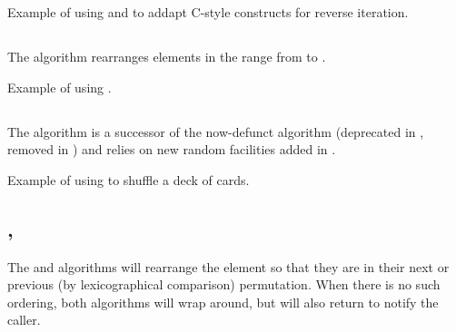 \begin{box-note}
\footnotesize Example of using  and  to addapt C-style constructs for reverse iteration.
\tcblower
{}
\end{box-note}

\subsection{\texorpdfstring{}{\texttt{std::rotate}}}

The  algorithm rearranges elements in the range from \cpp{[first, middle),[middle, last)} to \cpp{[middle, last),[first, middle)}.


\begin{box-note}
\footnotesize Example of using .
\tcblower
{}
\end{box-note}

\subsection{\texorpdfstring{}{\texttt{std::shuffle}}}

The  algorithm is a successor of the now-defunct  algorithm (deprecated in , removed in ) and relies on new random facilities added in .


\begin{box-note}
\footnotesize Example of using  to shuffle a deck of cards.
\tcblower
{}
\end{box-note}

\subsection{\texorpdfstring{, }{\texttt{std::next\_permutation}, \texttt{std::prev\_permutation}}}

The  and  algorithms will rearrange the element so that they are in their next or previous (by lexicographical comparison) permutation. When there is no such ordering, both algorithms will wrap around, but will also return  to notify the caller.

